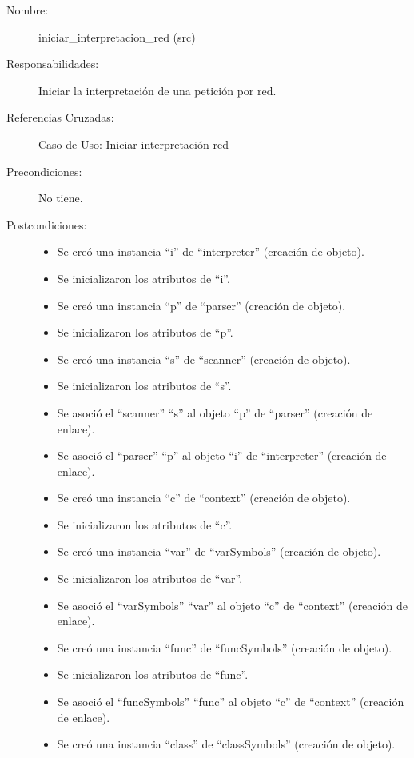 	\begin{description}
		\item [Nombre:] iniciar\_interpretacion\_red (src)
		\item [Responsabilidades:] Iniciar la interpretación de una petición por red.
		\item [Referencias Cruzadas: ] Caso de Uso: Iniciar interpretación red
      \item [Precondiciones:] No tiene.
      \item [Postcondiciones:] \hfill
      \begin {itemize}
         \item Se creó una instancia ``i'' de ``interpreter'' (creación de objeto).
         \item Se inicializaron los atributos de ``i''.
         \item Se creó una instancia ``p'' de ``parser'' (creación de objeto).
         \item Se inicializaron los atributos de ``p''.
         \item Se creó una instancia ``s'' de ``scanner'' (creación de objeto).
         \item Se inicializaron los atributos de ``s''.
         \item Se asoció el ``scanner'' ``s'' al objeto ``p'' de ``parser'' (creación de enlace).
         \item Se asoció el ``parser'' ``p'' al objeto ``i'' de ``interpreter'' (creación de enlace).
         \item Se creó una instancia ``c'' de ``context'' (creación de objeto).
         \item Se inicializaron los atributos de ``c''.
         \item Se creó una instancia ``var'' de ``varSymbols'' (creación de objeto).
         \item Se inicializaron los atributos de ``var''.
         \item Se asoció el ``varSymbols'' ``var'' al objeto ``c'' de ``context'' (creación de enlace).
         \item Se creó una instancia ``func'' de ``funcSymbols'' (creación de objeto).
         \item Se inicializaron los atributos de ``func''.
         \item Se asoció el ``funcSymbols'' ``func'' al objeto ``c'' de ``context'' (creación de enlace).
         \item Se creó una instancia ``class'' de ``classSymbols'' (creación de objeto).

\end{itemize}
\end{description}
